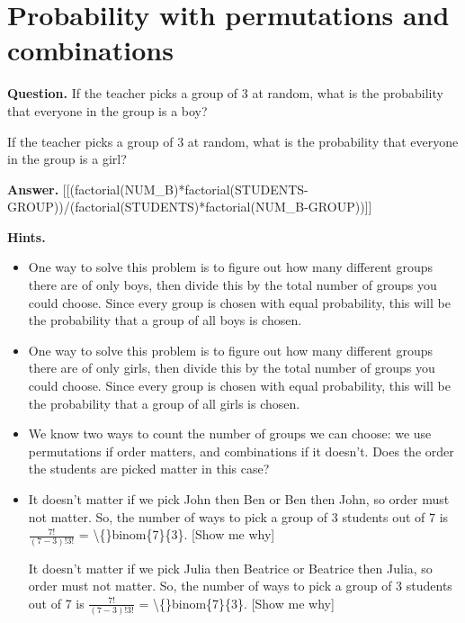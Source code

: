 \documentclass{article}
\begin{document}
\section*{Probability with permutations and combinations}
\textbf{Question.} If the teacher picks a group of 3 at random, what is the probability that 
                    everyone in the group is a boy?
                 
                    If the teacher picks a group of 3 at random, what is the probability that 
                    everyone in the group is a girl?

\textbf{Answer.} [[(factorial(NUM\_B)*factorial(STUDENTS-GROUP))/(factorial(STUDENTS)*factorial(NUM\_B-GROUP))]]

\textbf{Hints.}
\begin{itemize}
  \item One way to solve this problem is to figure out how many different groups
                        there are of only boys, then divide this
                        by the total number of groups you could choose. Since every group is chosen
                        with equal probability, this will be the probability that a group of all 
                        boys is chosen.
  \item One way to solve this problem is to figure out how many different groups
                        there are of only girls, then divide this
                        by the total number of groups you could choose. Since every group is chosen
                        with equal probability, this will be the probability that a group of all 
                        girls is chosen.
  \item We know two ways to count the number of groups we can choose: we use permutations if order matters,
                        and combinations if it doesn't. Does the order the students are picked matter in this case?
  \item It doesn't matter if we pick John then 
                            Ben or Ben then 
                            John, 
                            so order must not matter. So, the number of ways
                            to pick a group of 3 students out of 7 is
                             $\frac{7!}{(7-3)!3!}$ = 
                            \textbackslash\{\}binom\{7\}\{3\}.
                            [Show me why]
                        
                            It doesn't matter if we pick Julia then 
                            Beatrice or Beatrice then 
                            Julia, 
                            so order must not matter. So, the number of ways
                            to pick a group of 3 students out of 7 is
                             $\frac{7!}{(7-3)!3!}$ = 
                            \textbackslash\{\}binom\{7\}\{3\}.
                            [Show me why]
                        

\end{itemize}
\end{document}
